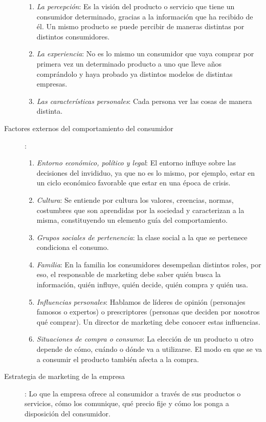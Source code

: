 \documentclass[10pt,a4paper,spanish]{report}
\begin{document}
\begin{description}
\begin{enumerate}
					\item \textit{\textcolor[rgb]{0.1,0.2,0.4}{La percepción}}: Es la visión del producto o servicio que tiene un consumidor determinado, gracias a la información que ha recibido de él. Un mismo producto se puede percibir de maneras distintas por distintos consumidores.
					\item \textit{\textcolor[rgb]{0.1,0.2,0.4}{La experiencia}}: No es lo mismo un consumidor que vaya comprar por primera vez un determinado producto a uno que lleve años comprándolo y haya probado ya distintos modelos de distintas empresas.
					\item \textit{\textcolor[rgb]{0.1,0.2,0.4}{Las características personales}}: Cada persona ver las cosas de manera distinta.
				\end{enumerate}
				\item[Factores externos del comportamiento del consumidor]:
				\begin{enumerate}
					\item \textit{\textcolor[rgb]{0.1,0.2,0.4}{Entorno económico, político y legal}}: El entorno influye sobre las decisiones del invididuo, ya que no es lo mismo, por ejemplo, estar en un ciclo económico favorable que estar en una época de crisis.

					\item \textit{\textcolor[rgb]{0.1,0.2,0.4}{Cultura}}: Se entiende por cultura los valores, creencias, normas, costumbres que son aprendidas por la sociedad y caracterizan a la misma, constituyendo un elemento guía del comportamiento.

					\item \textit{\textcolor[rgb]{0.1,0.2,0.4}{Grupos sociales de pertenencia}}: la clase social a la que se pertenece condiciona el consumo.

					\item \textit{\textcolor[rgb]{0.1,0.2,0.4}{Familia}}: En la familia los consumidores desempeñan distintos roles, por eso, el responsable de marketing debe saber quién busca la información, quién influye, quién decide, quién compra y quién usa.

					\item \textit{\textcolor[rgb]{0.1,0.2,0.4}{Influencias personales}}: Hablamos de líderes de opinión (personajes famosos o expertos) o prescriptores (personas que deciden por nosotros qué comprar). Un director de marketing debe conocer estas influencias.

					\item \textit{\textcolor[rgb]{0.1,0.2,0.4}{Situaciones de compra o consumo}}: La elección de un producto u otro depende de cómo, cuándo o dónde va a utilizarse. El modo en que se va a consumir el producto también afecta a la compra.
				\end{enumerate}
				\item[Estrategia de marketing de la empresa]: Lo que la empresa ofrece al consumidor a través de sus productos o servicios, cómo los comunique, qué precio fije y cómo los ponga a disposición del consumidor.
			\end{description}
\end{document}
